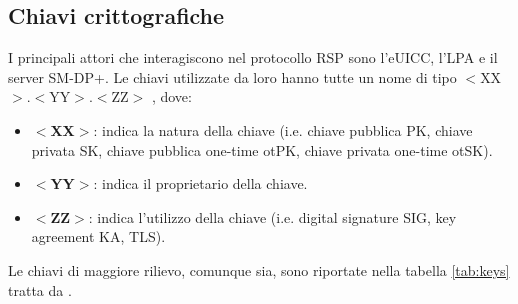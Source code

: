 \documentclass[10pt, oneside]{book}
\begin{document}
\subsection{Chiavi crittografiche}\label{sec:keys}
I principali attori che interagiscono nel protocollo RSP sono l'eUICC, l'LPA e il server SM-DP+. Le chiavi utilizzate da loro hanno tutte un nome di tipo $<$XX$>$.$<$YY$>$.$<$ZZ$>$ \cite{GSMA-docs-new}, dove:
\begin{itemize}
\item \textbf{$<$XX$>$}: indica la natura della chiave (i.e. chiave pubblica PK, chiave privata SK, chiave pubblica one-time otPK, chiave privata one-time otSK).
\item \textbf{$<$YY$>$}: indica il proprietario della chiave.
\item \textbf{$<$ZZ$>$}: indica l'utilizzo della chiave (i.e. digital signature SIG, key agreement KA, TLS).
\end{itemize}
Le chiavi di maggiore rilievo, comunque sia, sono riportate nella tabella \ref{tab:keys} tratta da \cite{GSMA-docs-old}.
\end{document}
